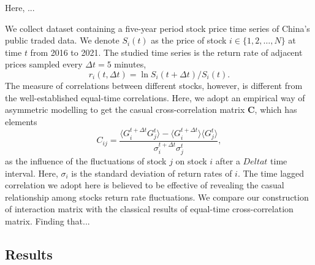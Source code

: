 Here, ...

We collect dataset containing a five-year period stock price time series of China's public traded data. We denote $S_i(t)$ as the price of stock $i\in\{ 1,2,\dots,N \}$ at time $t$ from 2016 to 2021. The studied time series is the return rate of adjacent prices sampled every $\Delta t = 5$ minutes,~\begin{equation}
    r_i(t, \Delta t) = \ln S_i(t+\Delta t) / S_i(t).
\end{equation} The measure of correlations between different stocks, however, is different from the well-established equal-time correlations. Here, we adopt an empirical way of asymmetric modelling to get the casual cross-correlation matrix $\mathbf{C}$, which has elements~\begin{equation}
    C_{ij} = \frac{\langle G_i^{t+\Delta t} G_j^{t} \rangle - \langle G_i^{t+\Delta t}\rangle \langle G_j^{t} \rangle}{\sigma_i^{t+\Delta t}\sigma_j^t},
\end{equation} as the influence of the fluctuations of stock $j$ on stock $i$ after a $Delta t$ time interval. Here, $\sigma_i$ is the standard deviation of return rates of $i$. The time lagged correlation we adopt here is believed to be effective of revealing the casual relationship among stocks return rate fluctuations. We compare our construction of interaction matrix with the classical results of equal-time cross-correlation matrix. Finding that...

\subsection{Results}

